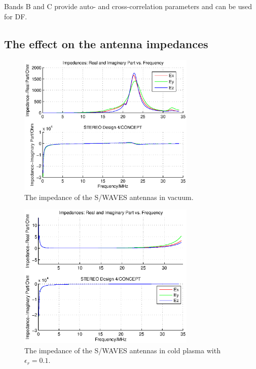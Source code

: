 \documentclass[two-coloumn,ras]{agutex}
\begin{document}
\begin{article}
Bands B and C provide auto- and cross-correlation parameters and can be used
for DF.\\
\subsection{The effect on the antenna impedances}

\begin{figure}
 \noindent\includegraphics[width=20pc]{impedance_stereo_vac.eps}
  \caption{The impedance of the S/WAVES antennas in vacuum.}\label{fig:imp_stereo_real}
\end{figure}

\begin{figure}
\noindent\includegraphics[width=20pc]{impedance_stereo_pl.eps}
  \caption{The impedance of the S/WAVES antennas in cold plasma with $\epsilon_r=0.1$.}\label{fig:imp_stereo_imag}
\end{figure}


\end{article}
\end{document}
